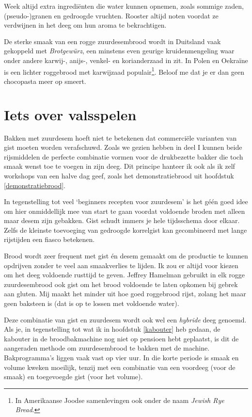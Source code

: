 \documentclass[
  11pt,
  dutch,
]{memoir}
\begin{document}
Week altijd extra ingrediënten die water kunnen opnemen, zoals sommige
zaden, (pseudo-)granen en gedroogde vruchten. Rooster altijd noten
voordat ze verdwijnen in het deeg om hun aroma te bekrachtigen.

De sterke smaak van een rogge zuurdesembrood wordt in Duitsland vaak
gekoppeld met \emph{Brotgewürz}, een minstens even geurige
kruidenmengeling waar onder andere karwij-, anijs-, venkel- en
korianderzaad in zit. In Polen en Oekraïne is een lichter roggebrood met
karwijzaad populair\footnote{In Amerikaanse Joodse samenlevingen ook
  onder de naam \emph{Jewish Rye Bread}.}. Beloof me dat je er dan geen
chocopasta meer op smeert.

\hypertarget{iets-over-valsspelen}{%
\section{Iets over valsspelen}\label{iets-over-valsspelen}}

\label{valsspelen}

Bakken met zuurdesem hoeft niet te betekenen dat commerciële varianten
van gist moeten worden verafschuwd. Zoals we gezien hebben in deel I
kunnen beide rijsmiddelen de perfecte combinatie vormen voor de
drukbezette bakker die toch smaak wenst toe te voegen in zijn deeg. Dit
principe hanteer ik ook als ik zelf workshops van een halve dag geef,
zoals het demonstratiebrood uit hoofdstuk \ref{demonstratiebrood}.

In tegenstelling tot veel `beginners recepten voor zuurdesem' is het
géén goed idee om hier onmiddellijk mee van start te gaan voordat
voldoende broden met alleen maar desem zijn gebakken. Gist schudt immers
je hele tijdsschema door elkaar. Zelfs de kleinste toevoeging van
gedroogde korrelgist kan gecombineerd met lange rijstijden een fiasco
betekenen.

Brood wordt zeer frequent met gist én desem gemaakt om de productie te
kunnen opdrijven zonder te veel aan smaakverlies te lijden. Ik zou er
altijd voor kiezen om het deeg voldoende rusttijd te geven. Jeffrey
Hamelman gebruikt in elk rogge zuurdesembrood ook gist om het brood
voldoende te laten opkomen bij gebrek aan gluten. Mij maakt het minder
uit hoe goed roggebrood rijst, zolang het maar geen baksteen is (dat is
op te lossen met voldoende water).

Deze combinatie van gist en zuurdesem wordt ook wel een \emph{hybride}
deeg genoemd. Als je, in tegenstelling tot wat ik in hoofdstuk
\ref{kabouter} heb gedaan, de kabouter in de broodbakmachine nog niet op
pensioen hebt geplaatst, is dit de aangeraden methode om zuurdesembrood
te bakken met de machine. Bakprogramma's liggen vaak vast op vier uur.
In die korte periode is smaak en volume kweken moeilijk, tenzij met een
combinatie van een voordeeg (voor de smaak) en toegevoegde gist (voor
het volume).
\end{document}

